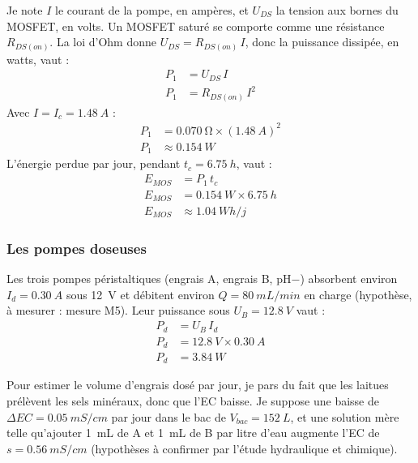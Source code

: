 \begin{demonstration}
Je note $I$ le courant de la pompe, en ampères, et $U_{DS}$ la tension aux bornes du MOSFET, en volts. Un MOSFET saturé se comporte comme une résistance $R_{DS(on)}$. La loi d'Ohm donne $U_{DS} = R_{DS(on)}\, I$, donc la puissance dissipée, en watts, vaut :
\begin{align*}
P_1 &= U_{DS}\, I\\
P_1 &= R_{DS(on)}\, I^2
\end{align*}
Avec $I = I_c = \qty{1,48}{A}$ :
\begin{align*}
P_1 &= \qty{0,070}{\ohm} \times (\qty{1,48}{A})^2\\
P_1 &\approx \qty{0,154}{W}
\end{align*}
L'énergie perdue par jour, pendant $t_c = \qty{6,75}{h}$, vaut :
\begin{align*}
E_{MOS} &= P_1\, t_c\\
E_{MOS} &= \qty{0,154}{W} \times \qty{6,75}{h}\\
E_{MOS} &\approx \qty{1,04}{Wh/j}
\end{align*}
\end{demonstration}

\subsubsection*{Les pompes doseuses}

Les trois pompes péristaltiques (engrais A, engrais B, pH$-$) absorbent environ $I_d = \qty{0,30}{A}$ sous \qty{12}{V} et débitent environ $Q = \qty{80}{mL/min}$ en charge (hypothèse, à mesurer : mesure M5). Leur puissance sous $U_B = \qty{12,8}{V}$ vaut :
\begin{align*}
P_d &= U_B\, I_d\\
P_d &= \qty{12,8}{V} \times \qty{0,30}{A}\\
P_d &= \qty{3,84}{W}
\end{align*}

Pour estimer le volume d'engrais dosé par jour, je pars du fait que les laitues prélèvent les sels minéraux, donc que l'EC baisse. Je suppose une baisse de $\Delta EC = \qty{0,05}{mS/cm}$ par jour dans le bac de $V_{bac} = \qty{152}{L}$, et une solution mère telle qu'ajouter \qty{1}{mL} de A et \qty{1}{mL} de B par litre d'eau augmente l'EC de $s = \qty{0,56}{mS/cm}$ (hypothèses à confirmer par l'étude hydraulique et chimique).

